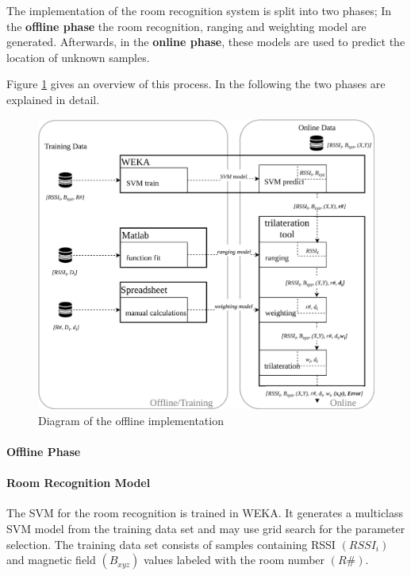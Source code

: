 The implementation of the room recognition system is split into two phases; 
In the \textbf{offline phase} the room recognition, ranging and weighting model are generated. Afterwards, in the \textbf{online phase}, these models are used to predict the location of unknown samples.

Figure \ref{fig:offlineImplementation} gives an overview of this process. In the following the two phases are explained in detail.

\begin{figure}[ht]
\centering
\includegraphics[width=\textwidth]{Figures/Offline_Set-Up}
\decoRule
\caption[Test bed offline implementation]{Diagram of the offline implementation}
\label{fig:offlineImplementation}
\end{figure}

\paragraph{Offline Phase}

\paragraph{Room Recognition Model}
The SVM for the room recognition is trained in WEKA. It generates a multiclass SVM model from the training data set and may use grid search for the parameter selection. The training data set consists of samples containing RSSI \((RSSI_{i})\) and magnetic field \((B_{xyz})\) values labeled with the room number \((R\#)\).

